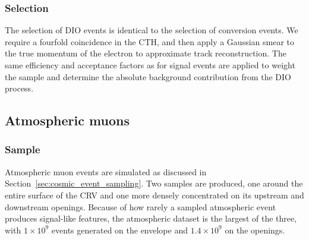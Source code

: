 \subsubsection{Selection}
The selection of DIO events is identical to the selection of conversion events.
We require a fourfold coincidence in the CTH, and then apply a Gaussian smear to
the true momentum of the electron to approximate track reconstruction. The same
efficiency and acceptance factors as for signal events are applied to weight the
sample and determine the absolute background contribution from the DIO process.


\subsection{Atmospheric muons}

\subsubsection{Sample}

Atmospheric muon events are simulated as discussed in
Section~\ref{sec:cosmic_event_sampling}. Two samples are produced, one around the
entire surface of the CRV and one more densely concentrated on its upstream and
downstream openings. Because of how rarely a sampled atmospheric event produces
signal-like features, the atmospheric dataset is the largest of the three, with
$1 \times 10^9$ events generated on the envelope and $1.4 \times 10^9$ on the
openings.



